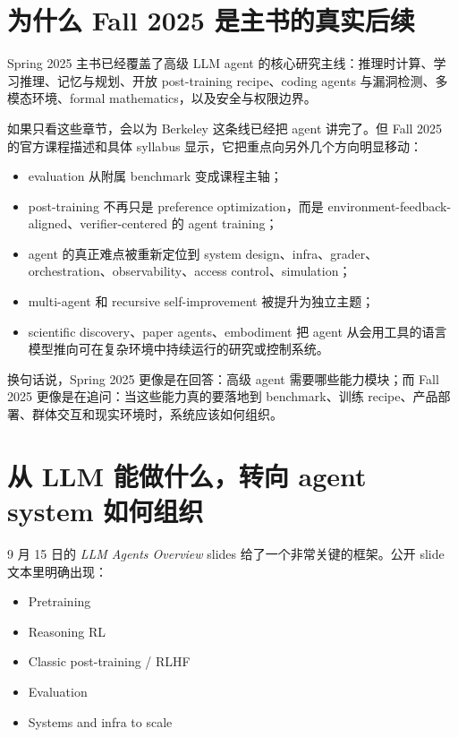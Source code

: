 \documentclass[11pt]{ctexbook}
\begin{document}
\section{为什么 Fall 2025 是主书的真实后续}

Spring 2025 主书已经覆盖了高级 LLM agent 的核心研究主线：推理时计算、学习推理、记忆与规划、开放 post-training recipe、coding agents 与漏洞检测、多模态环境、formal mathematics，以及安全与权限边界。

如果只看这些章节，会以为 Berkeley 这条线已经把 agent 讲完了。但 Fall 2025 的官方课程描述和具体 syllabus 显示，它把重点向另外几个方向明显移动：

\begin{itemize}
\item evaluation 从附属 benchmark 变成课程主轴；
\item post-training 不再只是 preference optimization，而是 environment-feedback-aligned、verifier-centered 的 agent training；
\item agent 的真正难点被重新定位到 system design、infra、grader、orchestration、observability、access control、simulation；
\item multi-agent 和 recursive self-improvement 被提升为独立主题；
\item scientific discovery、paper agents、embodiment 把 agent 从会用工具的语言模型推向可在复杂环境中持续运行的研究或控制系统。
\end{itemize}

换句话说，Spring 2025 更像是在回答：高级 agent 需要哪些能力模块；而 Fall 2025 更像是在追问：当这些能力真的要落地到 benchmark、训练 recipe、产品部署、群体交互和现实环境时，系统应该如何组织。

\section{从 LLM 能做什么，转向 agent system 如何组织}

9 月 15 日的 \emph{LLM Agents Overview} slides 给了一个非常关键的框架。公开 slide 文本里明确出现：

\begin{itemize}
\item Pretraining
\item Reasoning RL
\item Classic post-training / RLHF
\item Evaluation
\item Systems and infra to scale
\end{itemize}
\end{document}
